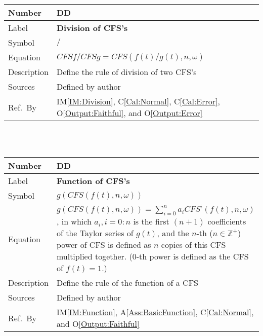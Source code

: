 \documentclass[12pt]{article}
\newcommand{\colAwidth}{0.13\textwidth}
\newcommand{\colBwidth}{0.82\textwidth}
\newcounter{defnum} %
\newcounter{datadefnum} %
\newcommand{\aref}[1]{A\ref{#1}}
\newcommand{\calref}[1]{C\ref{#1}}
\newcommand{\oref}[1]{O\ref{#1}}
\newcommand{\iref}[1]{IM\ref{#1}}
\begin{document}
\noindent
\begin{minipage}{\textwidth}
	\renewcommand*{\arraystretch}{1.5}
	\begin{tabular}{| p{\colAwidth} | p{\colBwidth}|}
		\hline
		\rowcolor[gray]{0.9}
		Number& DD{datadefnum}\thedatadefnum \label{DD:Division}\\
		\hline
		Label& \bf Division of CFS's\\
		\hline
		Symbol &$/$\\
		\hline
		Equation& $\mathit{CFSf}/\mathit{CFSg}=\mathit{CFS}(f(t)/g(t), n, \omega)$ \\
		\hline
		Description & Define the rule of division of two CFS's\\
		\hline
		Sources& Defined by author\\
		\hline
		Ref.\ By & \iref{IM:Division}, \calref{Cal:Normal}, \calref{Cal:Error},  \oref{Output:Faithful}, and \oref{Output:Error}\\
		\hline
	\end{tabular}
\end{minipage}\\
~\newline

\noindent
\begin{minipage}{\textwidth}
	\renewcommand*{\arraystretch}{1.5}
	\begin{tabular}{| p{\colAwidth} | p{\colBwidth}|}
		\hline
		\rowcolor[gray]{0.9}
		Number& DD{datadefnum}\thedatadefnum \label{DD:Function}\\
		\hline
		Label& \bf Function of CFS's\\
		\hline
		Symbol &$g(\mathit{CFS}(f(t), n, \omega))$\\
		\hline
		Equation& $g(\mathit{CFS}(f(t), n, \omega))=\sum_{i=0}^{n}a_i \mathit{CFS}^i(f(t), n, \omega)$, in which $a_i, i=0:n$ is the first $(n+1)$ coefficients of the Taylor series of $g(t)$, and the $n$-th ($n\in\mathbb{Z}^{+}$) power of CFS is defined as $n$ copies of this CFS multiplied together. ($0$-th power is defined as the CFS of $f(t)=1$.)\\
		\hline
		Description & Define the rule of the function of a CFS\\
		\hline
		Sources& Defined by author\\
		\hline
		Ref.\ By & \iref{IM:Function}, \aref{Ass:BasicFunction},  \calref{Cal:Normal}, and  \oref{Output:Faithful}\\
		\hline
	\end{tabular}
\end{minipage}\\
~\newline
\end{document}
